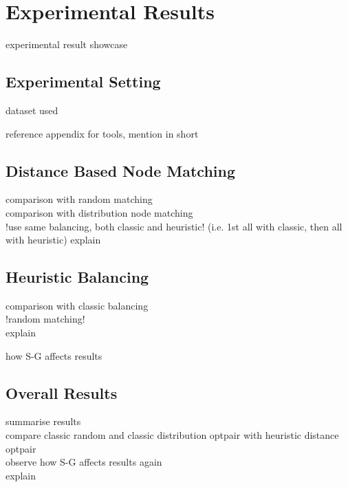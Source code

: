 \chapter{Experimental Results} \label{chap:expRes}

experimental result showcase

\section{Experimental Setting} \label{sec:expRes-setting}

dataset used

reference appendix for tools, mention in short

\section{Distance Based Node Matching} \label{sec:expRes-distNodeMatch}

comparison with random matching\\
comparison with distribution node matching\\
!use same balancing, both classic and heuristic! (i.e. 1st all with classic, then all with heuristic)
explain

\section{Heuristic Balancing} \label{sec:expRes-heuristic}

comparison with classic balancing\\
!random matching!\\
explain

how S-G affects results

\section{Overall Results} \label{sec:expRes-overall}

summarise results\\
compare classic random and classic distribution optpair with heuristic distance optpair\\
observe how S-G affects results again\\

explain